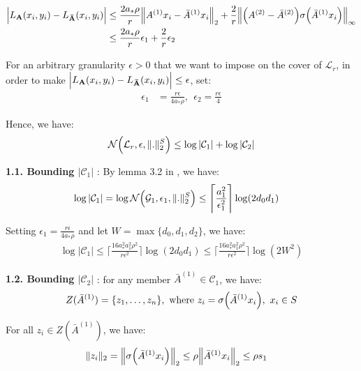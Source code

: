 \begin{itemize}
    \begin{align*}
        \Big| 
            L_{\bf A}(x_i, y_i) - L_{\bf \bar A}(x_i, y_i) 
         \Big| &\le \frac{2a_*\rho}{r} \Big\|A^{(1)}x_i - \bar A^{(1)}x_i\Big\|_2 + \frac{2}{r}\Big\| \Big( 
            A^{(2)} - \bar A^{(2)}
         \Big)\sigma\Big( \bar A^{(1)}x_i \Big) \Big\|_\infty \\
        &\le \frac{2a_*\rho}{r} \epsilon_1 + \frac{2}{r}\epsilon_2
    \end{align*}

    \noindent For an arbitrary granularity $\epsilon>0$ that we want to impose on the cover of $\mathcal{L}_r$, in order to make $\Big| L_{\bf A}(x_i, y_i) - L_{\bf \bar A}(x_i, y_i) \Big| \le \epsilon$, set:
    \begin{align*}
        \epsilon_1 &= \frac{r\epsilon}{4a_*\rho}, \ \ \epsilon_2 = \frac{r\epsilon}{4}
    \end{align*}

    \noindent Hence, we have:
    \begin{align*}
        \mathcal{N}\Big( \mathcal{L}_r, \epsilon, \|.\|_2^S \Big) \le \log |\mathcal{C}_1| + \log |\mathcal{C}_2|
    \end{align*}
\end{itemize}

\noindent\newline\textbf{1.1. Bounding $|\mathcal{C}_1|$} : By lemma 3.2 in \cite{article:bartlett}, we have:
\begin{align*}
    \log|\mathcal{C}_1| &= \log\mathcal{N}\Big( \mathcal{G}_1, \epsilon_1, \|.\|_2^S \Big) \le \Bigg\lceil
        \frac{a_1^2}{\epsilon_1^2}
    \Bigg\rceil\log(2d_0d_1)
\end{align*} 

\noindent Setting $\epsilon_1=\frac{r\epsilon}{4a_*\rho}$ and let $W=\max\{d_0, d_1, d_2 \}$, we have:
\begin{align*}
    \log |\mathcal{C}_1| \le \Bigg\lceil
        \frac{16a_*^2a_1^2\rho^2}{r\epsilon^2}
    \Bigg\rceil\log(2d_0d_1) \le 
    \Bigg\lceil
        \frac{16a_*^2a_1^2\rho^2}{r\epsilon^2}
    \Bigg\rceil\log(2W^2)
\end{align*}

\noindent\newline\textbf{1.2. Bounding $|\mathcal{C}_2|$} : for any member $\bar A^{(1)}\in \mathcal{C}_1$, we have: 
\begin{align*}
    Z(\bar A^{(1)}) = \{z_1, \dots, z_n\}, \text{ where } z_i = \sigma\Big( \bar A^{(1)}x_i \Big), \ x_i\in S
\end{align*}

\noindent For all $z_i \in Z(\bar A^{(1)})$, we have:
\begin{align*}
    \|z_i\|_2 &= \Big\| \sigma\Big( \bar A^{(1)} x_i \Big) \Big\|_2 \le \rho\Big\|\bar A^{(1)}x_i\Big\|_2 \le \rho s_1
\end{align*}



